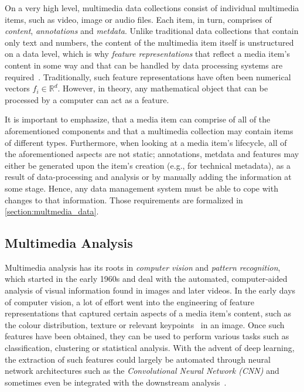 On a very high level, multimedia data collections consist of individual multimedia items, such as video, image or audio files. Each item, in turn, comprises of \emph{content}, \emph{annotations} and \emph{metdata}. Unlike traditional data collections that contain only text and numbers, the content of the multimedia item itself is unstructured on a data level, which is why \emph{feature representations} that reflect a media item's content in some way and that can be handled by data processing systems are required~\cite{Zahalka:2014towards}. Traditionally, such feature representations have often been numerical vectors $f_i \in \mathbb{R}^d$. However, in theory, any mathematical object that can be processed by a computer can act as a feature. 

It is important to emphasize, that a media item can comprise of all of the aforementioned components and that a multimedia collection may contain items of different types. Furthermore, when looking at a media item's lifecycle, all of the aforementioned aspects are not static; annotations, metdata and features may either be generated upon the item's creation (e.g., for technical metadata), as a result of data-processing and analysis or by manually adding the information at some stage. Hence, any data management system must be able to cope with changes to that information. Those requirements are formalized in \cref{section:multmedia_data}.

\subsection{Multimedia Analysis}

Multimedia analysis has its roots in \emph{computer vision} and \emph{pattern recognition}, which started in the early 1960s and deal with the automated, computer-aided analysis of visual information found in images and later videos. In the early days of computer vision, a lot of effort went into the engineering of feature representations that captured certain aspects of a media item's content, such as the colour distribution, texture or relevant keypoints~\cite{Lowe:1999object,Bay:2006surf} in an image. Once such features have been obtained, they can be used to perform various tasks such as classification, clustering or statistical analysis. With the advent of deep learning, the extraction of such features could largely be automated through neural network architectures such as the \emph{Convolutional Neural Network (CNN)} and sometimes even be integrated with the downstream analysis~\cite{Goodfellow:2016deep}. 

